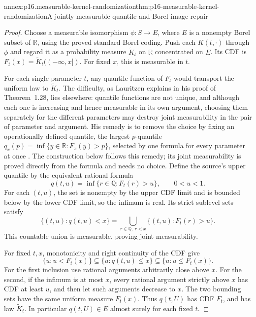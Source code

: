\begin{annexitem}{annex:p16.measurable-kernel-randomization}{thm:p16-measurable-kernel-randomization}{A jointly measurable quantile and Borel image repair}
\begin{proof}
Choose a measurable isomorphism \(\phi:S\to E\), where \(E\) is a
nonempty Borel subset of \(\mathbb R\), using the proved standard
Borel coding. Push each \(K(t,\cdot)\) through \(\phi\) and regard
it as a probability measure \(\widetilde K_t\) on \(\mathbb R\)
concentrated on \(E\). Its CDF is
\(F_t(x)=\widetilde K_t(( -\infty,x])\). For fixed \(x\), this
is measurable in \(t\).

For each single parameter \(t\), any quantile function of \(F_t\) would
transport the uniform law to \(\widetilde K_t\). The difficulty, as
Lauritzen explains in his proof of Theorem~1.28, lies elsewhere: quantile
functions are not unique, and although each one is increasing and hence
measurable in its own argument, choosing them separately for the
different parameters may destroy joint measurability in the pair of
parameter and argument. His remedy is to remove the choice by fixing an
operationally defined quantile, the largest \(p\)-quantile
\(q_x(p)=\inf\{y\in\mathbb R:F_x(y)>p\}\), selected by one formula for
every parameter at once
\cite[Theorem~1.28 and its proof, pp.~19--20]{Lauritzen2019GraphicalLectures2020}.
The construction below follows this remedy; its joint measurability is
proved directly from the formula and needs no choice. Define the source's
upper quantile by the equivalent rational formula
\[
 q(t,u)=\inf\{r\in\mathbb Q:F_t(r)>u\},\qquad 0<u<1.
\]
For each \((t,u)\), the set is nonempty by the upper CDF limit and
is bounded below by the lower CDF limit, so the infimum is real.
Its strict sublevel sets satisfy
\[
 \{(t,u):q(t,u)<x\}
   =\bigcup_{r\in\mathbb Q,\ r<x}\{(t,u):F_t(r)>u\}.
\]
This countable union is measurable, proving joint measurability.

For fixed \(t,x\), monotonicity and right continuity of the CDF give
\[
 \{u:u<F_t(x)\}\subseteq\{u:q(t,u)\leq x\}
                  \subseteq\{u:u\leq F_t(x)\}.
\]
For the first inclusion use rational arguments arbitrarily close above
\(x\). For the second, if the infimum is at most \(x\), every rational
argument strictly above \(x\) has CDF at least \(u\), and then let
such arguments decrease to \(x\). The two bounding sets have the same
uniform measure \(F_t(x)\). Thus \(q(t,U)\) has CDF \(F_t\), and
has law \(\widetilde K_t\). In particular \(q(t,U)\in E\) almost
surely for each fixed \(t\).


\end{proof}
\end{annexitem}
